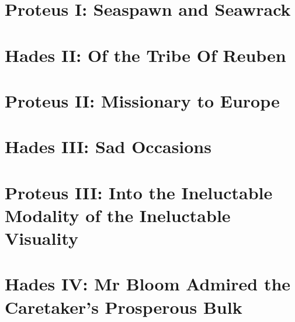 \section*{Proteus I: Seaspawn and Seawrack}


\section*{Hades II: Of the Tribe Of Reuben}


\section*{Proteus II: Missionary to Europe}


\section*{Hades III: Sad Occasions}


\section*{Proteus III: Into the Ineluctable Modality of the Ineluctable Visuality}


\section*{Hades IV: Mr Bloom Admired the Caretaker's Prosperous Bulk}



